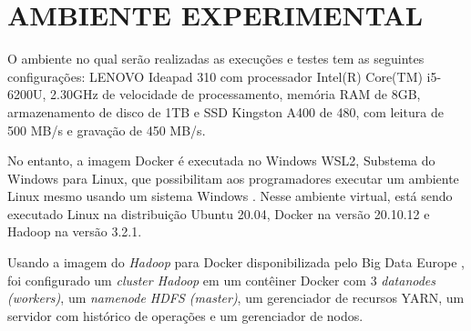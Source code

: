 \section{AMBIENTE EXPERIMENTAL} \label{sec:ambienteexperimental}

O ambiente no qual serão realizadas as execuções e testes tem as seguintes configurações: LENOVO Ideapad 310 com processador Intel(R) Core(TM) i5-6200U, 2.30GHz de velocidade de processamento,  memória RAM de 8GB, armazenamento de disco de 1TB e SSD Kingston A400 de 480, com leitura de 500 MB/s e gravação de 450 MB/s. 

No entanto, a imagem Docker é executada no Windows WSL2, Substema do Windows para Linux, que possibilitam aos programadores executar um ambiente Linux mesmo usando um sistema Windows \cite{MicrosoftWSL22}. Nesse ambiente virtual, está sendo executado Linux na distribuição Ubuntu 20.04, Docker na versão 20.10.12 e Hadoop na versão 3.2.1.

Usando a imagem do \textit{Hadoop} para Docker disponibilizada pelo Big Data Europe \cite{BigDataHadoopGithub}, foi configurado um \textit{cluster Hadoop} em um contêiner Docker com 3 \textit{datanodes (workers)}, um \textit{namenode HDFS (master)}, um gerenciador de recursos YARN, um servidor com histórico de operações e um gerenciador de nodos.
